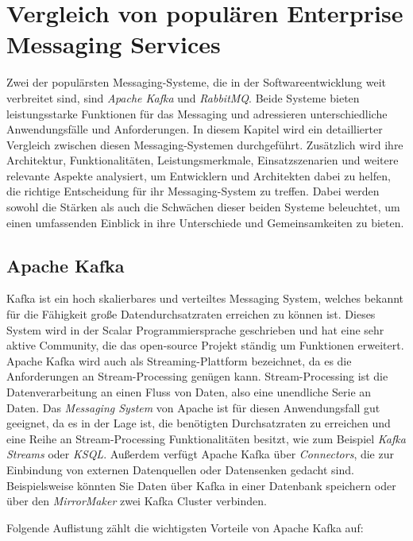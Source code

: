 \section{Vergleich von populären Enterprise Messaging Services}

Zwei der populärsten Messaging-Systeme, die in der Softwareentwicklung weit verbreitet sind, sind \emph{Apache Kafka} und \emph{RabbitMQ}. Beide Systeme bieten leistungsstarke Funktionen für das Messaging und adressieren unterschiedliche Anwendungsfälle und Anforderungen. In diesem Kapitel wird ein detaillierter Vergleich zwischen diesen Messaging-Systemen durchgeführt. Zusätzlich wird ihre Architektur, Funktionalitäten, Leistungsmerkmale, Einsatzszenarien und weitere relevante Aspekte analysiert, um Entwicklern und Architekten dabei zu helfen, die richtige Entscheidung für ihr Messaging-System zu treffen. Dabei werden sowohl die Stärken als auch die Schwächen dieser beiden Systeme beleuchtet, um einen umfassenden Einblick in ihre Unterschiede und Gemeinsamkeiten zu bieten.

\subsection{Apache Kafka}
\label{kakfaExplained}

Kafka ist ein hoch skalierbares und verteiltes Messaging System, welches bekannt für die Fähigkeit große Datendurchsatzraten erreichen zu können ist. Dieses System wird in der Scalar Programmiersprache geschrieben und hat eine sehr aktive Community, die das open-source Projekt ständig um Funktionen erweitert. Apache Kafka wird auch als Streaming-Plattform bezeichnet, da es die Anforderungen an Stream-Processing genügen kann. Stream-Processing ist die Datenverarbeitung an einen Fluss von Daten, also eine unendliche Serie an Daten. Das \emph{Messaging System} von Apache ist für diesen Anwendungsfall gut geeignet, da es in der Lage ist, die benötigten Durchsatzraten zu erreichen und eine Reihe an Stream-Processing Funktionalitäten besitzt, wie zum Beispiel \emph{Kafka Streams} oder \emph{KSQL}. Außerdem verfügt Apache Kafka über \emph{Connectors}, die zur Einbindung von externen Datenquellen oder Datensenken gedacht sind. Beispielsweise könnten Sie Daten über Kafka in einer Datenbank speichern oder über den \emph{MirrorMaker} zwei Kafka Cluster verbinden. \cite{narkhedeKafkaDefinitiveGuide2017,stopfordDesigningEventDrivenSystems2018}

Folgende Auflistung zählt die wichtigsten Vorteile von Apache Kafka auf: \cite{fuFairComparisonMessage2021}

